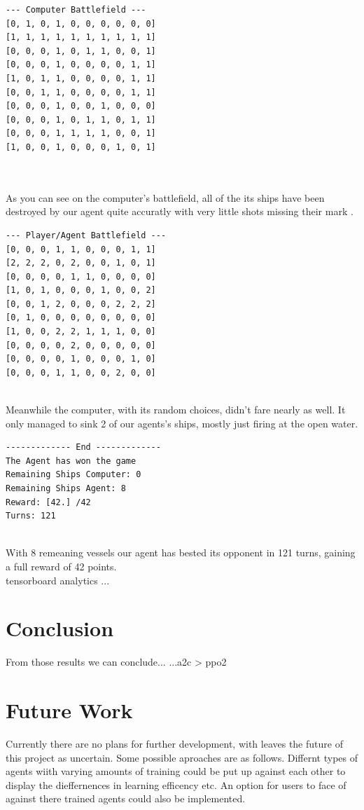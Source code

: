 \documentclass[sigconf]{acmart}
\begin{document}
\begin{lstlisting}
--- Computer Battlefield ---
[0, 1, 0, 1, 0, 0, 0, 0, 0, 0]
[1, 1, 1, 1, 1, 1, 1, 1, 1, 1]
[0, 0, 0, 1, 0, 1, 1, 0, 0, 1]
[0, 0, 0, 1, 0, 0, 0, 0, 1, 1]
[1, 0, 1, 1, 0, 0, 0, 0, 1, 1] 
[0, 0, 1, 1, 0, 0, 0, 0, 1, 1] 
[0, 0, 0, 1, 0, 0, 1, 0, 0, 0] 
[0, 0, 0, 1, 0, 1, 1, 0, 1, 1] 
[0, 0, 0, 1, 1, 1, 1, 0, 0, 1] 
[1, 0, 0, 1, 0, 0, 0, 1, 0, 1] 
\end{lstlisting}
\\
\\
As you can see on the computer's battlefield, all of the its ships have been destroyed by our agent quite accuratly with very little shots missing their mark .
\\

\begin{lstlisting}
--- Player/Agent Battlefield ---
[0, 0, 0, 1, 1, 0, 0, 0, 1, 1]
[2, 2, 2, 0, 2, 0, 0, 1, 0, 1]
[0, 0, 0, 0, 1, 1, 0, 0, 0, 0] 
[1, 0, 1, 0, 0, 0, 1, 0, 0, 2]
[0, 0, 1, 2, 0, 0, 0, 2, 2, 2]
[0, 1, 0, 0, 0, 0, 0, 0, 0, 0]
[1, 0, 0, 2, 2, 1, 1, 1, 0, 0]
[0, 0, 0, 0, 2, 0, 0, 0, 0, 0]
[0, 0, 0, 0, 1, 0, 0, 0, 1, 0]
[0, 0, 0, 1, 1, 0, 0, 2, 0, 0]
\end{lstlisting}
 \\
Meanwhile the computer, with its random choices, didn't fare nearly as well. It only managed to sink 2 of our agents's ships, mostly just firing at the open water.
\\
\begin{lstlisting}
------------- End -------------
The Agent has won the game
Remaining Ships Computer: 0
Remaining Ships Agent: 8
Reward: [42.] /42
Turns: 121
\end{lstlisting}
\\
With 8 remeaning vessels our agent has bested its opponent in 121 turns, gaining a full reward of 42 points.
\\
tensorboard analytics 
...
 
 \section{Conclusion}
   From those results we can conclude...
  ...a2c > ppo2
  
 \section{Future Work}
Currently there are no plans for further development, with leaves the future of  this project as uncertain. Some possible aproaches are as follows. 
Differnt types of agents wiith varying amounts of training could be put up against each other to display the dieffernences in learning efficency etc. An option for users to face of against there trained agents could also be implemented.
\end{document}
